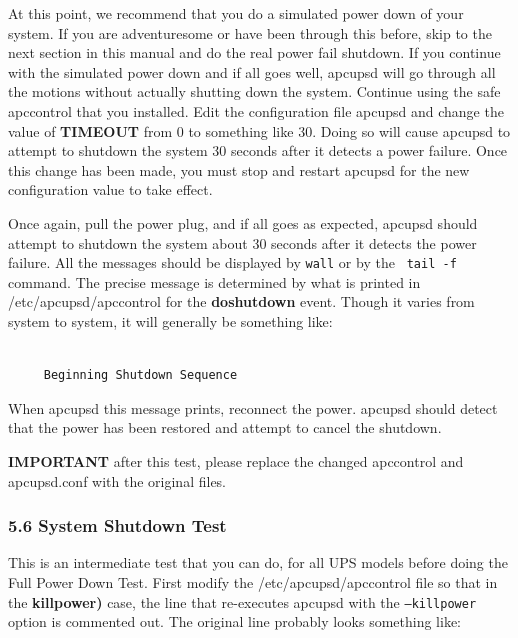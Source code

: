 At this point, we recommend that you do a simulated power down of your system.
If you are adventuresome or have been through this before, skip to the next
section in this manual and do the real power fail shutdown. If you continue
with the simulated power down and if all goes well, apcupsd will go through
all the motions without actually shutting down the system. Continue using the
safe apccontrol that you installed. Edit the configuration file apcupsd and
change the value of {\bf TIMEOUT} from 0 to something like 30. Doing so will
cause apcupsd to attempt to shutdown the system 30 seconds after it detects a
power failure. Once this change has been made, you must stop and restart
apcupsd for the new configuration value to take effect.  

Once again, pull the power plug, and if all goes as expected, apcupsd should
attempt to shutdown the system about 30 seconds after it detects the power
failure. All the messages should be displayed by {\tt wall} or by the {\tt
tail -f} command. The precise message is determined by what is printed in
/etc/apcupsd/apccontrol for the {\bf doshutdown} event.  Though it varies from
system to system, it will generally be something like: 

\footnotesize
\begin{verbatim}
     
     Beginning Shutdown Sequence
\end{verbatim}
\normalsize

When apcupsd this message prints, reconnect the power.  apcupsd should detect
that the power has been restored and attempt to cancel the shutdown.  

{\bf IMPORTANT} after this test, please replace the changed apccontrol and
apcupsd.conf with the original files. 

\label{System-Shutdown-Test}

\subsubsection*{5.6 System Shutdown Test}

\label{index-System-Shutdown-test-95}
\label{index-Testing_002c-System-Shutdown-96}
This is an intermediate test that you can do, for all UPS models before doing
the Full Power Down Test. First modify the /etc/apcupsd/apccontrol file so
that in the {\bf killpower)} case, the line that re-executes apcupsd with the
{\tt --killpower} option is commented out. The original line probably looks
something like: 

